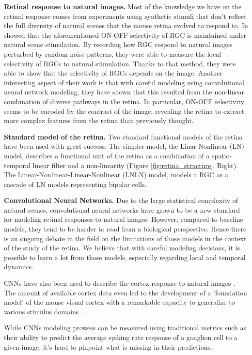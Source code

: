 \textbf{Retinal response to natural images.}
Most of the knowledge we have on the retinal response comes from experiments
using synthetic stimuli that don't reflect the full diversity of natural
scenes that the mouse retina evolved to respond to. In
\cite{goldin_context-dependent_2022} showed that the
aforementioned ON-OFF selectivity of RGC is maintained under natural scene
stimulation. By recording how RGC respond to natural images perturbed by
random noise patterns, they were able to measure the local selectivity of RGCs
to natural stimulation.
Thanks to that method, they were able to show that the selectivity of RGCs
depends on the image. Another interesting aspect of their work is that with
careful modeling using convolutional neural network modeling, they have shown
that this resulted from the non-linear combination of diverse pathways in the
retina. In particular, ON-OFF selectivity seems to be encoded by the contrast
of the image, revealing the retina to extract more complex features from the
retina than previously thought.

\textbf{Standard model of the retina.}
Two standard functional models of the retina have been used with
great success. The simpler model, the Linar-Nonlinear (LN) model, describes a
functional unit
of the retina as a combination of a spatio-temporal linear filter and a
non-linearity (Figure \ref{fig:retina_structure}, Right).
The Linear-Nonlinear-Linear-Nonlinear (LNLN) model, models a RGC as a cascade
of LN models representing bipolar cells.

\textbf{Convolutional Neural Networks.}
Due to the large statistical complexity of natural scenes, convolutional neural
networks have grown to be a new standard for modeling retinal responses to
natural images. However, compared to baseline models, they tend to be harder to
read from a biological perspective. Hence there is an ongoing debate in the
field on the limitations of those models in the context of the study of the
retina. We believe that with careful modeling decisions, it is possible to
learn a lot from those models, especially regarding local and temporal
dynamics.

CNNs have also been used to describe the cortex response to natural images
\citep{cadena_deep_2019}. The amount of available cortex data even led to the
development of a 'foundation model' of the mouse visual cortex with a
remarkable capacity to generalize to various stimulus domains
\citep{wang_towards_2023}.

While CNNs modeling prowess can be measured using traditional metrics such as
their ability to predict the average spiking rate response of a ganglion cell
to a given image, it's hard to pinpoint what is missing in their predictions.

\clearpage
